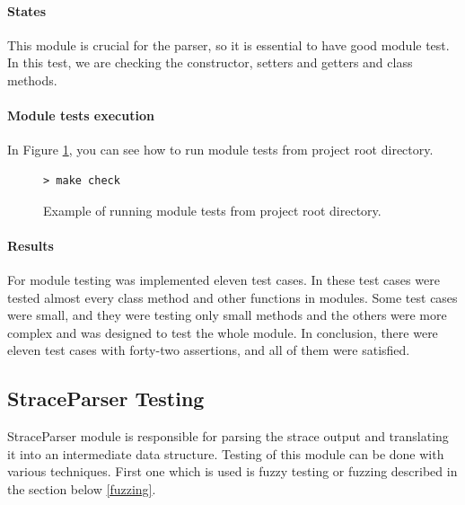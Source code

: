 \paragraph{States}
This module is crucial for the parser, so it is essential to have good module
test. In this test, we are checking the constructor, setters and getters and
class methods.

\paragraph{Module tests execution}
In Figure \ref{exec/unit_tests}, you can see how to run module tests from project
root directory.

\begin{figure}[h]
	\lstset{style=npl}
\begin{lstlisting}
> make check
\end{lstlisting}
	\caption{Example of running module tests from project root directory.}
	\label{exec/unit_tests}
\end{figure}

\paragraph{Results}
For module testing was implemented eleven test cases. In these test cases were
tested almost every class method and other functions in modules. Some test cases
were small, and they were testing only small methods and the others were more
complex and was designed to test the whole module. In conclusion, there were
eleven test cases with forty-two assertions, and all of them were satisfied.


\subsection{StraceParser Testing}
StraceParser module is responsible for parsing the strace output and translating
it into an intermediate data structure. Testing of this module can be done with
various techniques. First one which is used is fuzzy testing or fuzzing
described in the section below \ref{fuzzing}.

